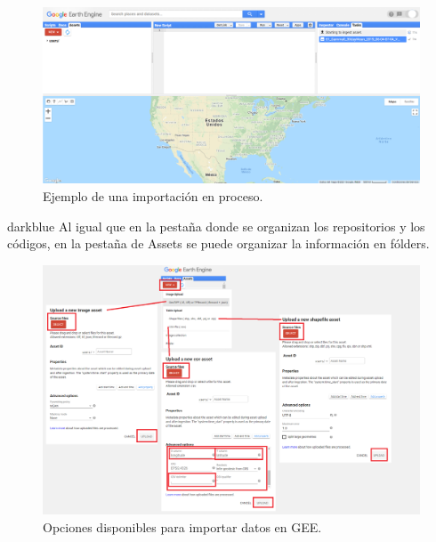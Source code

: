 \documentclass[
  12pt,
  letterpaper,
  twoside]{book}
\begin{document}
\begin{figure}

{\centering \includegraphics[width=1\linewidth]{Img/Asset3} 

}

\caption{Ejemplo de una importación en proceso.}\label{fig:unnamed-chunk-168}
\end{figure}

\begin{bluebox2}

\begin{awesomeblock}{5pt}{\faLightbulb}{darkblue}
Al igual que en la pestaña donde se organizan los repositorios y los códigos, en la pestaña de Assets se puede organizar la información en fólders.

\end{awesomeblock}

\end{bluebox2}

\begin{figure}

{\centering \includegraphics[width=1\linewidth]{Img/newAssets} 

}

\caption{Opciones disponibles para importar datos en GEE.}\label{fig:unnamed-chunk-169}
\end{figure}
\end{document}
